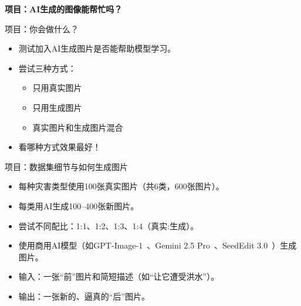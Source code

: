 \begin{frame}
  \centering
  \vspace{2.5cm}
  {\LARGE \textbf{项目：AI生成的图像能帮忙吗？}}
\end{frame}

\begin{refsection}
\begin{frame}{项目：你会做什么？}
  \begin{itemize}
    \item 测试加入AI生成图片是否能帮助模型学习。
    \item 尝试三种方式：
      \begin{itemize}
        \item 只用真实图片
        \item 只用生成图片
        \item 真实图片和生成图片混合
      \end{itemize}
    \item 看哪种方式效果最好！
  \end{itemize}
\end{frame}
\end{refsection}

\begin{refsection}
\begin{frame}{项目：数据集细节与如何生成图片}
  \begin{itemize}
    \item 每种灾害类型使用100张真实图片（共6类，600张图片）。
    \item 每类用AI生成100–400张新图片。
    \item 尝试不同配比：1:1、1:2、1:3、1:4（真实:生成）。
    \item 使用商用AI模型（如GPT-Image-1~\parencite{gptimage1}、Gemini 2.5 Pro~\parencite{geminiteamgoogleGemini25Pushing}、SeedEdit 3.0~\parencite{wang2025seedit}）生成图片。
    \item 输入：一张“前”图片和简短描述（如“让它遭受洪水”）。
    \item 输出：一张新的、逼真的“后”图片。
  \end{itemize}
  \bottomleftrefs
\end{frame}
\end{refsection}

